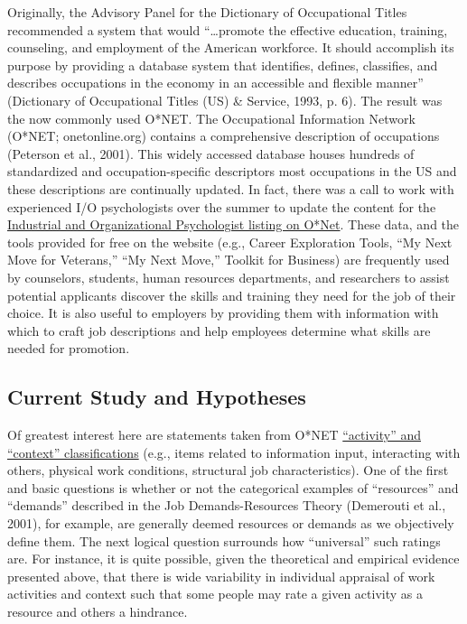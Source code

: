 \documentclass[
  english,
  man]{apa6}
\begin{document}
Originally, the Advisory Panel for the Dictionary of Occupational Titles recommended a system that would ``\ldots promote the effective education, training, counseling, and employment of the American workforce. It should accomplish its purpose by providing a database system that identifies, defines, classifies, and describes occupations in the economy in an accessible and flexible manner'' (Dictionary of Occupational Titles (US) \& Service, 1993, p. 6). The result was the now commonly used O*NET. The Occupational Information Network (O*NET; onetonline.org) contains a comprehensive description of occupations (Peterson et al., 2001). This widely accessed database houses hundreds of standardized and occupation-specific descriptors most occupations in the US and these descriptions are continually updated. In fact, there was a call to work with experienced I/O psychologists over the summer to update the content for the \href{https://www.onetonline.org/link/summary/19-3032.00}{Industrial and Organizational Psychologist listing on O*Net}. These data, and the tools provided for free on the website (e.g., Career Exploration Tools, ``My Next Move for Veterans,'' ``My Next Move,'' Toolkit for Business) are frequently used by counselors, students, human resources departments, and researchers to assist potential applicants discover the skills and training they need for the job of their choice. It is also useful to employers by providing them with information with which to craft job descriptions and help employees determine what skills are needed for promotion.

\hypertarget{current-study-and-hypotheses}{%
\subsection{Current Study and Hypotheses}\label{current-study-and-hypotheses}}

Of greatest interest here are statements taken from O*NET \href{https://www.O*NETonline.org/find/descriptor/result/4.A.1.b.3}{``activity'' and ``context'' classifications} (e.g., items related to information input, interacting with others, physical work conditions, structural job characteristics). One of the first and basic questions is whether or not the categorical examples of ``resources'' and ``demands'' described in the Job Demands-Resources Theory (Demerouti et al., 2001), for example, are generally deemed resources or demands as we objectively define them. The next logical question surrounds how ``universal'' such ratings are. For instance, it is quite possible, given the theoretical and empirical evidence presented above, that there is wide variability in individual appraisal of work activities and context such that some people may rate a given activity as a resource and others a hindrance.
\end{document}
